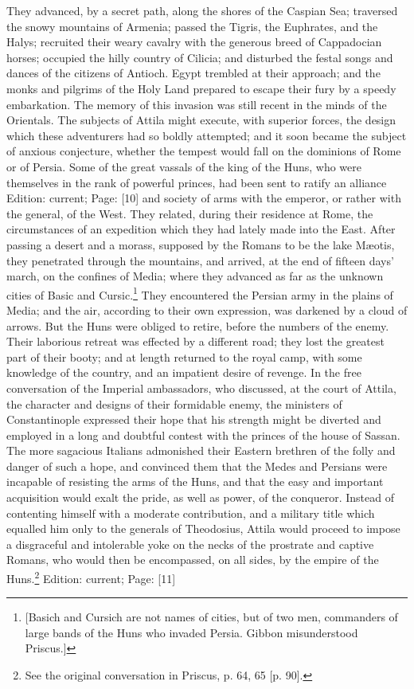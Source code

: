 They advanced, by a secret path, along the shores of the Caspian Sea; traversed the snowy mountains of Armenia; passed the Tigris, the Euphrates, and the Halys; recruited their weary cavalry with the generous breed of Cappadocian horses; occupied the hilly country of Cilicia; and disturbed the festal songs and dances of the citizens of Antioch. Egypt trembled at their approach; and the monks and pilgrims of the Holy Land prepared to escape their fury by a speedy embarkation. The memory of this invasion was still recent in the minds of the Orientals. The subjects of Attila might execute, with superior forces, the design which these adventurers had so boldly attempted; and it soon became the subject of anxious conjecture, whether the tempest would fall on the dominions of Rome or of Persia. Some of the great vassals of the king of the Huns, who were themselves in the rank of powerful princes, had been sent to ratify an alliance Edition: current; Page: [10] and society of arms with the emperor, or rather with the general, of the West. They related, during their residence at Rome, the circumstances of an expedition which they had lately made into the East. After passing a desert and a morass, supposed by the Romans to be the lake Mæotis, they penetrated through the mountains, and arrived, at the end of fifteen days\texthebrew{}’ march, on the confines of Media; where they advanced as far as the unknown cities of Basic and Cursic.\footnote{[Basich and Cursich are not names of cities, but of two men, commanders of large bands of the Huns who invaded Persia. Gibbon misunderstood Priscus.]} They encountered the Persian army in the plains of Media; and the air, according to their own expression, was darkened by a cloud of arrows. But the Huns were obliged to retire, before the numbers of the enemy. Their laborious retreat was effected by a different road; they lost the greatest part of their booty; and at length returned to the royal camp, with some knowledge of the country, and an impatient desire of revenge. In the free conversation of the Imperial ambassadors, who discussed, at the court of Attila, the character and designs of their formidable enemy, the ministers of Constantinople expressed their hope that his strength might be diverted and employed in a long and doubtful contest with the princes of the house of Sassan. The more sagacious Italians admonished their Eastern brethren of the folly and danger of such a hope, and convinced them that the Medes and Persians were incapable of resisting the arms of the Huns, and that the easy and important acquisition would exalt the pride, as well as power, of the conqueror. Instead of contenting himself with a moderate contribution, and a military title which equalled him only to the generals of Theodosius, Attila would proceed to impose a disgraceful and intolerable yoke on the necks of the prostrate and captive Romans, who would then be encompassed, on all sides, by the empire of the Huns.\footnote{See the original conversation in Priscus, p. 64, 65 [p. 90].}
Edition: current; Page: [11]

